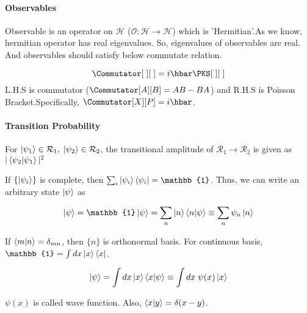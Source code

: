 \documentclass[final]{IEEEphot}
\renewcommand{\O}{\mathcal{O}}
\renewcommand{\H}{\mathcal{H}} %
\newcommand{\hket}[1][\psi]{\ket{#1}} %
\newcommand{\VS}{\vspace{0.3cm}} %
\newcommand{\Com}{,\hspace{0.1cm}} %
\newcommand{\hs}{\hspace{0.1cm}} %
\begin{document}
\paragraph{Observables}

\VS

Observable is an operator on $\H$ ($\O : \H \rightarrow \H$) which is 'Hermitian'.\footnotemark[2]
As we know, hermitian operator has real eigenvalues. So, eigenvalues of observables are real. And observables should satisfy below commutate relation.

\begin{equation}
\label{eq:22}
 \Commutator[\hs][\hs] = i\hbar \PKS[\hs][\hs]
\end{equation}
L.H.S is commutator ($\Commutator[A][B] = AB-BA$) and R.H.S is Poisson Bracket.\footnotemark[3]
Specifically, $\Commutator[X][P] = i\hbar$.

\paragraph{Transition Probability}

\VS

For $\ket{\psi_1} \in \mathcal{R}_1\Com \ket{\psi_2} \in \mathcal{R}_2$, the transitional amplitude of $\mathcal{R}_1 \rightarrow \mathcal{R}_2$ is given as
$|\braket{\psi_2|\psi_1}|^2$

\noindent
If $\{ \hket[\psi_i] \}$ is complete, then $\sum_i \ket{\psi_i}\bra{\psi_i} = \mathbb{1}$. Thus, we can write an arbitrary state $\hket$ as

\begin{equation}
 \hket = \mathbb{1} \hket = \sum_n \ket{n}\braket{n|\psi} \equiv \sum_n \psi_n \ket{n}
\end{equation}

If $\braket{m|n} = \delta_{mn}$, then $\{n\}$ is orthonormal basis. For continuous basis,
$\mathbb{1} = \int dx \ket{x}\bra{x}$. 

\begin{equation}
 \hket = \int dx \ket{x}\braket{x|\psi} \equiv \int dx \hs \psi(x) \ket{x}
\end{equation}

$\psi(x)$ is called wave function. Also, $\braket{x|y} = \delta(x-y)$.
\end{document}
